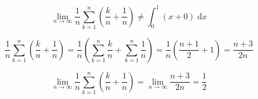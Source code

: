 \documentclass[12pt,b5paper]{ltjsarticle}
\begin{document}
\newpage


\begin{equation}
 \lim_{n\to\infty} \frac{1}{n} \sum_{k=1}^{n} \left( \frac{k}{n}+\frac{1}{n} \right)
  \ne
  \int_{0}^{1}(x+0) \; \mathrm{d}x
\end{equation}


\hrulefill

\begin{equation}
 \frac{1}{n} \sum_{k=1}^{n} \left( \frac{k}{n}+\frac{1}{n} \right)
  =
  \frac{1}{n} \left( \sum_{k=1}^{n}\frac{k}{n} + \sum_{k=1}^{n}\frac{1}{n} \right)
  =
  \frac{1}{n} \left( \frac{n+1}{2} + 1 \right)
  =
  \frac{n+3}{2n}
\end{equation}

\begin{equation}
 \lim_{n\to\infty} \frac{1}{n} \sum_{k=1}^{n} \left( \frac{k}{n}+\frac{1}{n} \right)
  =
  \lim_{n\to\infty} \frac{n+3}{2n} =\frac{1}{2}
\end{equation}
\end{document}
